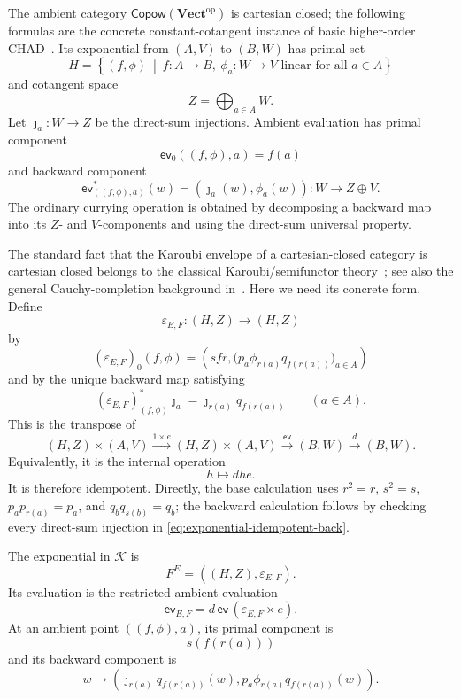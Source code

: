 \documentclass[runningheads,envcountsame]{llncs}
\newcommand{\Vectop}{\mathbf{Vect}^{\mathrm{op}}}
\newcommand{\Copow}{\mathsf{Copow}}
\begin{document}
The ambient category $\Copow(\Vectop)$ is cartesian closed; the following
formulas are the concrete constant-cotangent instance of basic higher-order
CHAD~\cite{Vakar2021,VakarSmeding2022}. Its exponential from $(A,V)$ to
$(B,W)$ has primal set
$$
H=
\left\{
(f,\phi)\ \middle|\
f:A\to B,
\ \phi_a:W\to V\text{ linear for all }a\in A
\right\}
$$
and cotangent space
$$
Z=\bigoplus_{a\in A}W.
$$
Let $\jmath_a:W\to Z$ be the direct-sum injections. Ambient evaluation has
primal component
$$
\mathsf{ev}_0((f,\phi),a)=f(a)
$$
and backward component
\begin{equation}
\mathsf{ev}_{((f,\phi),a)}^*(w)
=
(\jmath_a(w),\phi_a(w)):
W\longrightarrow Z\oplus V.
\label{eq:ambient-evaluation}
\end{equation}
The ordinary currying operation is obtained by decomposing a backward map
into its $Z$- and $V$-components and using the direct-sum universal property.

The standard fact that the Karoubi envelope of a cartesian-closed category is
cartesian closed belongs to the classical Karoubi/semifunctor theory~\cite{Hoofman1993,HoofmanMoerdijk1995}; see also the general Cauchy-completion
background in~\cite{BorceuxDejean1986}. Here we need its concrete form.
Define
$$
\varepsilon_{E,F}:(H,Z)\longrightarrow(H,Z)
$$
by
\begin{equation}
(\varepsilon_{E,F})_0(f,\phi)
=
\left(
 s f r,
 \bigl(p_a\phi_{r(a)}q_{f(r(a))}\bigr)_{a\in A}
\right)
\label{eq:exponential-idempotent-base}
\end{equation}
and by the unique backward map satisfying
\begin{equation}
(\varepsilon_{E,F})^*_{(f,\phi)}\jmath_a
=
\jmath_{r(a)}q_{f(r(a))}
\qquad(a\in A).
\label{eq:exponential-idempotent-back}
\end{equation}
This is the transpose of
$$
(H,Z)\times(A,V)
\xrightarrow{1\times e}
(H,Z)\times(A,V)
\xrightarrow{\mathsf{ev}}
(B,W)
\xrightarrow{d}
(B,W).
$$
Equivalently, it is the internal operation
$$
h\longmapsto dhe.
$$
It is therefore idempotent. Directly, the base calculation uses
$r^2=r$, $s^2=s$, $p_ap_{r(a)}=p_a$, and $q_bq_{s(b)}=q_b$; the backward
calculation follows by checking every direct-sum injection in
\eqref{eq:exponential-idempotent-back}.

The exponential in $\mathcal K$ is
\begin{equation}
F^E=((H,Z),\varepsilon_{E,F}).
\label{eq:kar-exponential}
\end{equation}
Its evaluation is the restricted ambient evaluation
$$
\mathsf{ev}_{E,F}
=
d\,\mathsf{ev}\,(\varepsilon_{E,F}\times e).
$$
At an ambient point $((f,\phi),a)$, its primal component is
$$
s(f(r(a)))
$$
and its backward component is
\begin{equation}
w\longmapsto
\left(
 \jmath_{r(a)}q_{f(r(a))}(w),
 p_a\phi_{r(a)}q_{f(r(a))}(w)
\right).
\label{eq:kar-evaluation-explicit}
\end{equation}
\end{document}
